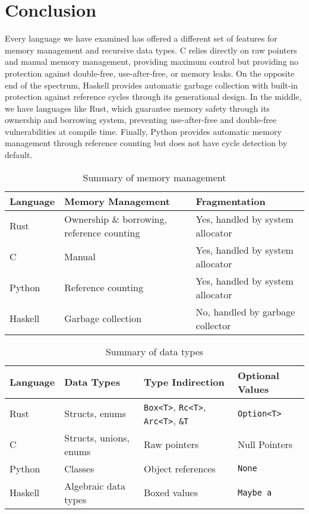 \documentclass[12pt, letterpaper]{article}
\begin{document}
\section{Conclusion}
Every language we have examined has offered a different set of features for memory management and recursive data types. C relies directly on raw pointers and manual memory management, providing maximum control but providing no protection against double-free, use-after-free, or memory leaks. On the opposite end of the spectrum, Haskell provides automatic garbage collection with built-in protection against reference cycles through its generational design. In the middle, we have languages like Rust, which guarantee memory safety through its ownership and borrowing system, preventing use-after-free and double-free vulnerabilities at compile time. Finally, Python provides automatic memory management through reference counting but does not have cycle detection by default.
\begin{table}[H]
	\centering
	\begin{tabular}{p{2cm}|p{4cm}|p{6cm}}
		Language & Memory Management                          & Fragmentation                    \\
		\hline
		Rust     & Ownership \& borrowing, reference counting & Yes, handled by system allocator \\
		\hline
		C        & Manual                                     & Yes, handled by system allocator \\
		\hline
		Python   & Reference counting                         & Yes, handled by system allocator \\
		\hline
		Haskell  & Garbage collection                         & No, handled by garbage collector \\
	\end{tabular}
	\caption{Summary of memory management}
\end{table}
\begin{table}[H]
	\centering
	\begin{tabular}{p{3cm}|p{3cm}|p{3cm}|p{3cm}}
		Language         & Data Types             &
		Type Indirection & Optional Values                                                                                              \\
		\hline
		Rust             & Structs, enums         & \texttt{Box<T>}, \texttt{Rc<T>}, \texttt{Arc<T>}, \texttt{\&T} & \texttt{Option<T>} \\
		\hline
		C                & Structs, unions, enums & Raw pointers                                                   & Null Pointers      \\
		\hline
		Python           & Classes                & Object references                                              & \texttt{None}      \\
		\hline
		Haskell          & Algebraic data types   & Boxed values                                                   & \texttt{Maybe a}   \\
	\end{tabular}
	\caption{Summary of data types}
\end{table}
\end{document}
